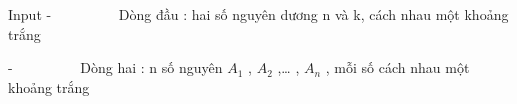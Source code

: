 Input
-          Dòng đầu : hai số nguyên dương n và k, cách nhau một khoảng trắng  

   -          Dòng hai : n số nguyên $A_{1}$   , $A_{2}$   ,… , $A_{n}$   , mỗi số cách nhau một khoảng trắng